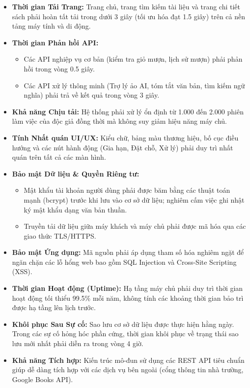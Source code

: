 \begin{itemize}
    \item \textbf{Thời gian Tải Trang:} Trang chủ, trang tìm kiếm tài liệu và trang chi tiết sách phải hoàn tất tải trong dưới 3 giây (tối ưu hóa đạt 1.5 giây) trên cả nền tảng máy tính và di động.
    
    \item \textbf{Thời gian Phản hồi API:} 
    \begin{itemize}
        \item Các API nghiệp vụ cơ bản (kiểm tra giỏ mượn, lịch sử mượn) phải phản hồi trong vòng 0.5 giây.
        \item Các API xử lý thông minh (Trợ lý ảo AI, tóm tắt văn bản, tìm kiếm ngữ nghĩa) phải trả về kết quả trong vòng 3 giây.
    \end{itemize}
    
    \item \textbf{Khả năng Chịu tải:} Hệ thống phải xử lý ổn định từ 1.000 đến 2.000 phiên làm việc của độc giả đồng thời mà không suy giảm hiệu năng máy chủ.
    
    \item \textbf{Tính Nhất quán UI/UX:} Kiểu chữ, bảng màu thương hiệu, bố cục điều hướng và các nút hành động (Gia hạn, Đặt chỗ, Xử lý) phải duy trì nhất quán trên tất cả các màn hình.
    
    \item \textbf{Bảo mật Dữ liệu \& Quyền Riêng tư:} 
    \begin{itemize}
        \item Mật khẩu tài khoản người dùng phải được băm bằng các thuật toán mạnh (bcrypt) trước khi lưu vào cơ sở dữ liệu; nghiêm cấm việc ghi nhật ký mật khẩu dạng văn bản thuần.
        \item Truyền tải dữ liệu giữa máy khách và máy chủ phải được mã hóa qua các giao thức TLS/HTTPS.
    \end{itemize}
    
    \item \textbf{Bảo mật Ứng dụng:} Mã nguồn phải áp dụng tham số hóa nghiêm ngặt để ngăn chặn các lỗ hổng web bao gồm SQL Injection và Cross-Site Scripting (XSS).
    
    \item \textbf{Thời gian Hoạt động (Uptime):} Hạ tầng máy chủ phải duy trì thời gian hoạt động tối thiểu 99.5\% mỗi năm, không tính các khoảng thời gian bảo trì được hạ tầng lên lịch trước.
    
    \item \textbf{Khôi phục Sau Sự cố:} Sao lưu cơ sở dữ liệu được thực hiện hằng ngày. Trong các sự cố hỏng hóc phần cứng, thời gian khôi phục về trạng thái sao lưu mới nhất phải diễn ra trong vòng 4 giờ.
    
    \item \textbf{Khả năng Tích hợp:} Kiến trúc mô-đun sử dụng các REST API tiêu chuẩn giúp dễ dàng tích hợp với các dịch vụ bên ngoài (cổng thông tin nhà trường, Google Books API).
\end{itemize}
